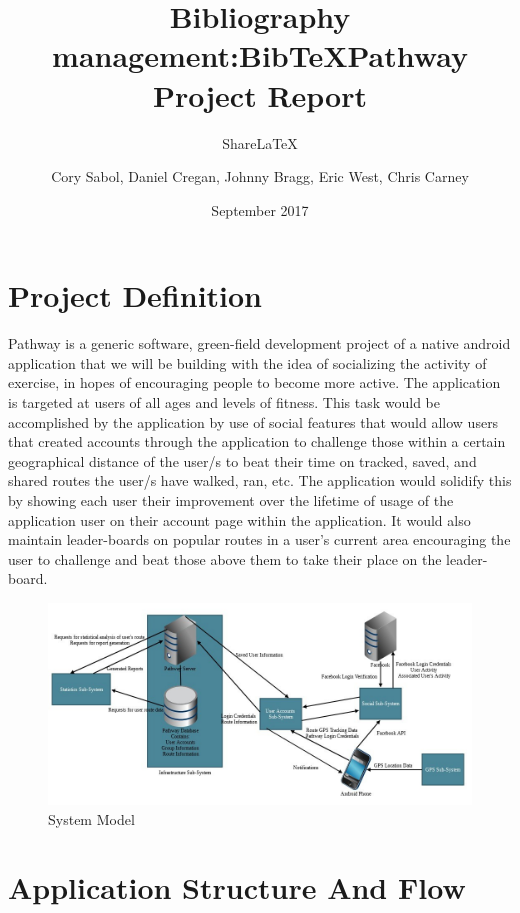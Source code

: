 ﻿\documentclass{article}
\title{Bibliography management:BibTeX}
\author{Share\LaTeX}
\title{Pathway Project Report}
\author{Cory Sabol, Daniel Cregan, Johnny Bragg, Eric West, Chris Carney}
\date{September 2017}
\begin{document}
\maketitle

\pagebreak

\tableofcontents

\pagebreak

\section{Project Definition}
Pathway is a generic software, green-field development project of a native android application that we will be building with the idea of socializing the activity of exercise, in hopes of encouraging people to become more active. The application is targeted at users of all ages and levels of fitness. This task would be accomplished by the application by use of social features that would allow users that created accounts through the application to challenge those within a certain geographical distance of the user/s to beat their time on tracked, saved, and shared routes the user/s have walked, ran, etc. The application would solidify this by showing each user their improvement over the lifetime of usage of the application user on their account page within the application. It would also maintain leader-boards on popular routes in a user's current area encouraging the user to challenge and beat those above them to take their place on the leader-board.
\begin{figure}[!htb]
    \centering
    \includegraphics[width=\textwidth]{system_model.jpg}
    \caption{System Model}
    \label{fig:my_label}
\end{figure}

\pagebreak


\section{Application Structure And Flow}
\end{document}
